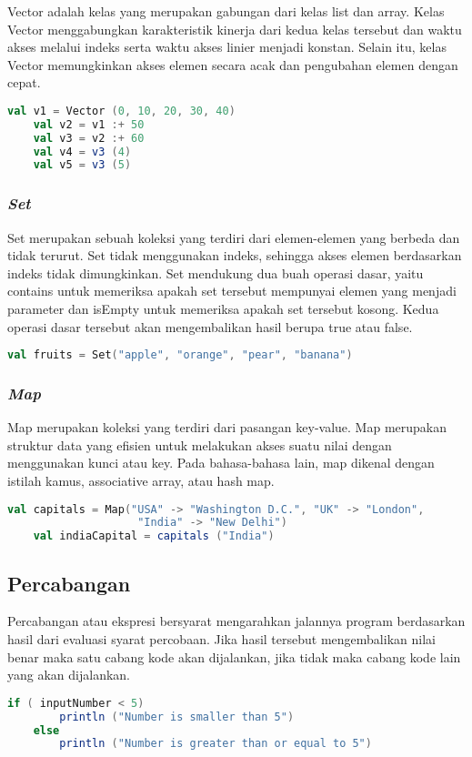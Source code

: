 Vector adalah kelas yang merupakan gabungan dari kelas list dan array. Kelas Vector menggabungkan
karakteristik kinerja dari kedua kelas tersebut dan waktu akses melalui indeks serta
waktu akses linier menjadi konstan. Selain itu, kelas Vector memungkinkan akses elemen secara
acak dan pengubahan elemen dengan cepat.


\begin{lstlisting}[language=Scala, caption= Contoh penggunaan Vector]
	val v1 = Vector (0, 10, 20, 30, 40)
	val v2 = v1 :+ 50
	val v3 = v2 :+ 60
	val v4 = v3 (4)
	val v5 = v3 (5)
\end{lstlisting}

\subsubsection{\textit{Set}}
Set merupakan sebuah koleksi yang terdiri dari elemen-elemen yang berbeda dan tidak terurut.
Set tidak menggunakan indeks, sehingga akses elemen berdasarkan indeks tidak dimungkinkan.
Set mendukung dua buah operasi dasar, yaitu contains untuk memeriksa apakah set tersebut
mempunyai elemen yang menjadi parameter dan isEmpty untuk memeriksa apakah set tersebut
kosong. Kedua operasi dasar tersebut akan mengembalikan hasil berupa true atau false.

\begin{lstlisting}[language=Scala, caption= Contoh deklarasi set]
	val fruits = Set("apple", "orange", "pear", "banana")
\end{lstlisting}

\subsubsection{\textit{Map}}
Map merupakan koleksi yang terdiri dari pasangan key-value. Map merupakan struktur data yang
efisien untuk melakukan akses suatu nilai dengan menggunakan kunci atau key. Pada bahasa-bahasa
lain, map dikenal dengan istilah kamus, associative array, atau hash map.

\begin{lstlisting}[language=Scala, caption= Contoh deklarasi dan penggunaan map]
	val capitals = Map("USA" -> "Washington D.C.", "UK" -> "London", 
					"India" -> "New Delhi")
	val indiaCapital = capitals ("India")
\end{lstlisting}

\subsection{Percabangan}
Percabangan atau ekspresi bersyarat mengarahkan jalannya program berdasarkan hasil dari evaluasi
syarat percobaan. Jika hasil tersebut mengembalikan nilai benar maka satu cabang kode akan
dijalankan, jika tidak maka cabang kode lain yang akan dijalankan.
\begin{lstlisting}[showstringspaces=false, language=Scala, caption= Contoh dasar percabangan]
	if ( inputNumber < 5)
		println ("Number is smaller than 5")
	else
		println ("Number is greater than or equal to 5")
\end{lstlisting}

